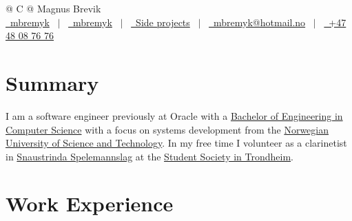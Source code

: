 \documentclass[a4paper,12pt]{article}
\begin{document}
\pagestyle{empty} 



\begin{tabularx}{\linewidth}{@{} C @{}}
\Huge{Magnus Brevik} \\[7.5pt]
\href{https://github.com/mbremyk}{\raisebox{-0.05\height}\faGithub\ mbremyk} \ $|$ \ 
\href{https://linkedin.com/in/mbremyk}{\raisebox{-0.05\height}\faLinkedin\ mbremyk} \ $|$ \ 
\href{https://mbremyk.github.io}{\raisebox{-0.05\height}\faGlobe \ Side projects} \ $|$ \ 
\href{mailto:mbremyk@hotmail.no}{\raisebox{-0.05\height}\faEnvelope \ mbremyk@hotmail.no} \ $|$ \ 
\href{tel:+4748087676}{\raisebox{-0.05\height}\faMobile \ +47 48 08 76 76} \\
\end{tabularx}


\section{Summary}
I am a software engineer previously at Oracle with a \href{https://www.ntnu.no/studier/bidata}{Bachelor of Engineering in Computer Science} with a focus on systems development from the \href{https://www.ntnu.no/}{Norwegian University of Science and Technology}.
In my free time I volunteer as a clarinetist in \href{https://snaustrinda.samfundet.no/}{Snaustrinda Spelemannslag} at the \href{https://www.samfundet.no/}{Student Society in Trondheim}.


\section{Work Experience}
\end{document}
